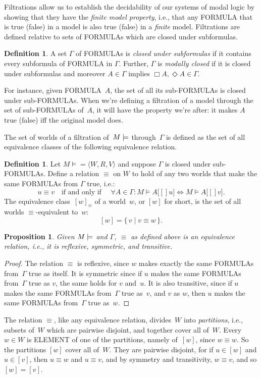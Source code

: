 \documentclass[10pt,a4paper]{article}
\newcommand*{\olup}[1]{\MakeUppercase{#1}}
\theoremstyle{plain}
\newtheorem{prop}[thm]{Proposition}
\theoremstyle{definition}
\newtheorem{defn}[thm]{Definition}
\theoremstyle{remark}
\newcommand*{\ollabel}[1]{\label{#1}}
\providecommand{\mSat}[3]{\ensuremath{#1 \models #2[#3]}}
\providecommand{\mModel}[2]{\ensuremath{#1 \models #2}}
\providecommand{\tuple}[1]{\langle #1 \rangle}
\providecommand{\Setabs}[2]{\{\, #1 \mid #2 \,\}}
\begin{document}
Filtrations allow us to establish the decidability of our systems of
modal logic by showing that they have the \emph{finite model
  property}, i.e., that any \olup{formula} that is true (false) in a
model is also true (false) in a \emph{finite} model.  Filtrations are
defined relative to sets of \olup{formula}s which are closed under
subformulas.

\begin{defn}\ollabel{defn:modallyclosed}
  A set $\Gamma$ of \olup{formula}s is \emph{closed under subformulas} if it
  contains every subformula of \olup{formula} in $\Gamma$. Further,
  $\Gamma$ is \emph{modally closed} if it is closed under subformulas
  and moreover $A \in \Gamma$ implies $\Box A,
  \Diamond A \in \Gamma$. 
\end{defn}

For instance, given \olup{formula}~$A$, the set of all its
sub-\olup{formula}s is closed under sub-\olup{formula}s. When we're defining
a filtration of a model through the set of sub-\olup{formula}s of~$A$,
it will have the property we're after: it makes $A$ true (false) iff
the original model does.

The set of worlds of a filtration of~$\mModel{M}$ through~$\Gamma$ is
defined as the set of all equivalence classes of the following
equivalence relation.

\begin{defn}
Let $\mModel{M} =\tuple{W, R, V}$ and suppose $\Gamma$ is closed under
sub-\olup{formula}s. Define a relation $\equiv$ on $W$ to hold of any two
worlds that make the same \olup{formula}s from $\Gamma$ true, i.e.:
\[
u \equiv v \quad \text{if and only if } \quad 
\forall A \in \Gamma : \mSat{M}{A}[u] \Leftrightarrow \mSat{M}{A}[v].
\]
The equivalence class~$[w]_\equiv$ of a world~$w$, or $[w]$ for short,
is the set of all worlds $\equiv$-equivalent to~$w$:
\[
[w] = \Setabs{v}{v \equiv w}.
\]
\end{defn}

\begin{prop}
  Given $\mModel{M}$ and $\Gamma$, $\equiv$ as defined above is an
  equivalence relation, i.e., it is reflexive, symmetric, and
  transitive.
\end{prop}

\begin{proof}
  The relation $\equiv$ is reflexive, since $w$ makes exactly the same
  \olup{formula}s from~$\Gamma$ true as itself. It is symmetric since if
  $u$ makes the same \olup{formula}s from~$\Gamma$ true as $v$, the same
  holds for $v$ and~$u$. It is also transitive, since if $u$ makes the
  same \olup{formula}s from~$\Gamma$ true as~$v$, and $v$ as $w$, then
  $u$ makes the same \olup{formula}s from~$\Gamma$ true as~$w$.
\end{proof}

The relation $\equiv$, like any equivalence relation, divides~$W$ into
\emph{partitions}, i.e., subsets of~$W$ which are pairwise disjoint,
and together cover all of~$W$. Every $w \in W$ is \olup{element} of one
of the partitions, namely of~$[w]$, since $w \equiv w$. So the
partitions $[w]$ cover all of~$W$. They are pairwise disjoint, for if
$u \in [w]$ and $u \in [v]$, then $u \equiv w$ and $u \equiv v$, and
by symmetry and transitivity, $w \equiv v$, and so $[w] = [v]$.
\end{document}

